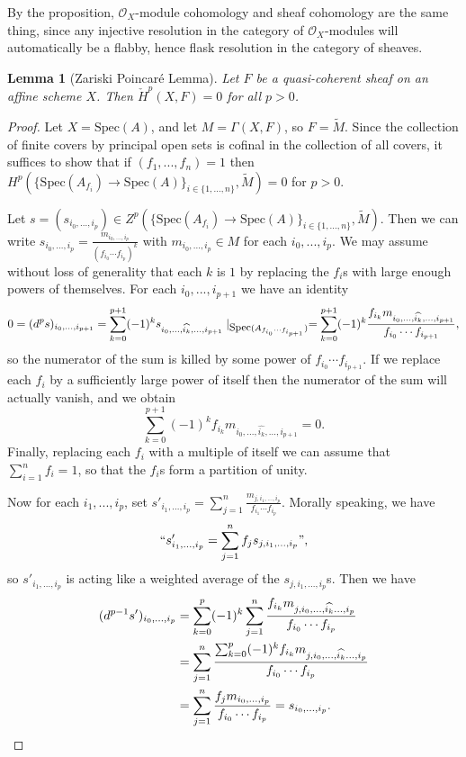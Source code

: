 \documentclass[letterpaper,11pt]{article}
\newtheorem{lem}{Lemma}
\theoremstyle{definition}
\theoremstyle{remark}
\begin{document}
By the proposition, $\mathcal{O}_X$-module cohomology and sheaf cohomology are the same thing, since any injective resolution in the category of $\mathcal{O}_X$-modules will automatically be a flabby, hence flask resolution in the category of sheaves.

\begin{lem}[Zariski Poincar\'{e} Lemma]\label{poincare} Let $F$ be a quasi-coherent sheaf on an affine scheme $X$. Then $\check{H}^p(X,F) = 0$ for all $p > 0$.
\end{lem}
\begin{proof} Let $X=\mbox{Spec}(A)$, and let $M = \Gamma(X,F)$, so $F = \widetilde{M}$. Since the collection of finite covers by principal open sets is cofinal in the collection of all covers, it suffices to show that if $(f_1, ..., f_n) = 1$ then $H^p(\{\mbox{Spec}(A_{f_i})\rightarrow \mbox{Spec}(A)\}_{i\in\{1,...,n\}}, \widetilde{M}) = 0$ for $p>0$.

Let $s = (s_{i_0, ..., i_p}) \in Z^p(\{\mbox{Spec}(A_{f_i})\rightarrow \mbox{Spec}(A)\}_{i\in\{1,...,n\}}, \widetilde{M})$. Then we can write $s_{i_0, ..., i_p} = \frac{m_{i_0, ..., i_p}}{(f_{i_0}\cdots f_{i_p})^k}$ with $m_{i_0, ..., i_p}\in M$ for each $i_0, ..., i_p$. We may assume without loss of generality that each $k$ is $1$ by replacing the $f_i$s with large enough powers of themselves. For each $i_0, ..., i_{p+1}$ we have an identity
\[
0 = (d^ps)_{i_0, ..., i_{p+1}} = \sum_{k=0}^{p+1} (-1)^k s_{i_0, ..., \widehat{i_k}, ..., i_{p+1}}\mid_{\mbox{\small Spec}(A_{f_{i_0}\cdots f_{i_{p+1}}})} = \sum_{k=0}^{p+1} (-1)^k \frac{f_{i_k}m_{i_0, ..., \widehat{i_k}, ..., i_{p+1}}}{f_{i_0}\cdots f_{i_{p+1}}},
\]
so the numerator of the sum is killed by some power of $f_{i_0}\cdots f_{i_{p+1}}$. If we replace each $f_i$ by a sufficiently large power of itself then the numerator of the sum will actually vanish, and we obtain
\[
\sum_{k=0}^{p+1} (-1)^{k} f_{i_k}m_{i_0, ..., \widehat{i_k}, ..., i_{p+1}} = 0.
\]
Finally, replacing each $f_i$ with a multiple of itself we can assume that $\sum_{i=1}^n f_i = 1$, so that the $f_i$s form a partition of unity.

Now for each $i_1, ..., i_{p}$, set $s'_{i_1, ..., i_p} = \sum_{j=1}^n \frac{m_{j, i_1, ..., i_p}}{f_{i_1}\cdots f_{i_p}}$. Morally speaking, we have
\[
``s'_{i_1, ..., i_p} = \sum_{j=1}^n f_js_{j, i_1, ..., i_p}",
\]
so $s'_{i_1, ..., i_p}$ is acting like a weighted average of the $s_{j, i_1, ..., i_p}$s. Then we have
\begin{align*}
(d^{p-1}s')_{i_0, ..., i_p} &= \sum_{k=0}^p (-1)^k \sum_{j=1}^n \frac{f_{i_k}m_{j, i_0, ..., \widehat{i_k} ..., i_p}}{f_{i_0}\cdots f_{i_p}}\\
&= \sum_{j=1}^n \frac{\sum_{k=0}^p (-1)^k f_{i_k}m_{j, i_0, ..., \widehat{i_k} ..., i_p}}{f_{i_0}\cdots f_{i_p}}\\
&= \sum_{j=1}^n \frac{f_jm_{i_0, ..., i_p}}{f_{i_0}\cdots f_{i_p}} = s_{i_0, ..., i_p}.\qedhere
\end{align*}
\end{proof}
\end{document}
